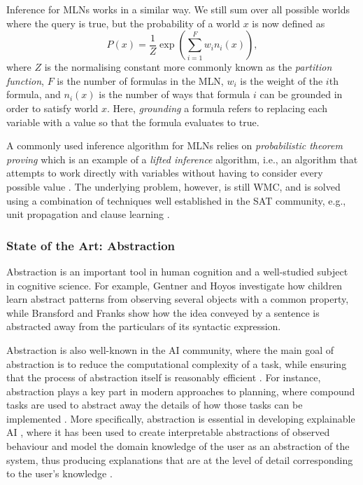 \documentclass{article}
\begin{document}
Inference for MLNs works in a similar way. We still sum over all possible
worlds where the query is true, but the probability of a world $x$ is now
defined as
\[
  P(x) = \frac{1}{Z} \exp \left( \sum_{i=1}^F w_i n_i(x) \right),
\]
where $Z$ is the normalising constant more commonly known as the \emph{partition
function}, $F$ is the number of formulas in the MLN, $w_i$ is the weight of the
$i$th formula, and $n_i(x)$ is the number of ways that formula $i$ can be
grounded in order to satisfy world $x$. Here, \emph{grounding} a formula refers
to replacing each variable with a value so that the formula evaluates to true.

A commonly used inference algorithm for MLNs relies on \emph{probabilistic
  theorem proving}
\cite{DBLP:journals/cacm/GogateD16,DBLP:journals/cib/Venugopal17}
which is an example of a \emph{lifted inference} algorithm, i.e., an algorithm
that attempts to work directly with variables without having to consider every
possible value \cite{DBLP:conf/ijcai/Poole03}. The underlying problem, however,
is still WMC, and is solved using a combination of techniques well established
in the SAT community, e.g., unit propagation and clause learning
\cite{DBLP:journals/cib/Venugopal17}.

\subsubsection{State of the Art: Abstraction}

Abstraction is an important tool in human cognition and a well-studied subject
in cognitive science. For example, Gentner and Hoyos \cite{Gentner2017-GENAAA-2}
investigate how children learn abstract patterns from observing several
objects with a common property, while Bransford and Franks
\cite{BRANSFORD1971331} show how the idea conveyed by a sentence is abstracted
away from the particulars of its syntactic expression.

Abstraction is also well-known in the AI community,
where the main goal of abstraction is to reduce the computational complexity of
a task, while ensuring that the process of abstraction itself is reasonably
efficient \cite{saitta2013abstraction}. For instance, abstraction plays a key
part in modern approaches to planning, where compound tasks are used to abstract
away the details of how those tasks can be implemented
\cite{DBLP:journals/amai/ErolHN96}. More specifically, abstraction is essential
in developing explainable AI \cite{DBLP:journals/access/AdadiB18}, where
it has been used to create interpretable abstractions of observed behaviour
\cite{DBLP:journals/corr/PenkovR17} and model the domain knowledge of the user
as an abstraction of the system, thus producing explanations that are at the
level of detail corresponding to the user's knowledge
\cite{DBLP:conf/ijcai/SreedharanSK18}.
\end{document}
